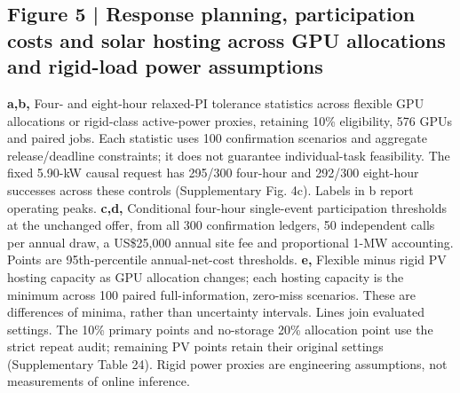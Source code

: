 \documentclass[10pt,a4paper]{article}
\begin{document}
\begin{minipage}{\textwidth}
\subsection*{Figure 5 | Response planning, participation costs and solar hosting across GPU allocations and rigid-load power assumptions}

\textbf{a,b,} Four- and eight-hour relaxed-PI tolerance statistics across flexible GPU allocations or rigid-class active-power proxies, retaining 10\% eligibility, 576 GPUs and paired jobs. Each statistic uses 100 confirmation scenarios and aggregate release/deadline constraints; it does not guarantee individual-task feasibility. The fixed 5.90-kW causal request has 295/300 four-hour and 292/300 eight-hour successes across these controls (Supplementary Fig. 4c). Labels in b report operating peaks. \textbf{c,d,} Conditional four-hour single-event participation thresholds at the unchanged offer, from all 300 confirmation ledgers, 50 independent calls per annual draw, a US\$25,000 annual site fee and proportional 1-MW accounting. Points are 95th-percentile annual-net-cost thresholds. \textbf{e,} Flexible minus rigid PV hosting capacity as GPU allocation changes; each hosting capacity is the minimum across 100 paired full-information, zero-miss scenarios. These are differences of minima, rather than uncertainty intervals. Lines join evaluated settings. The 10\% primary points and no-storage 20\% allocation point use the strict repeat audit; remaining PV points retain their original settings (Supplementary Table 24). Rigid power proxies are engineering assumptions, not measurements of online inference.
\end{minipage}\par\vspace{7pt}
\end{document}
